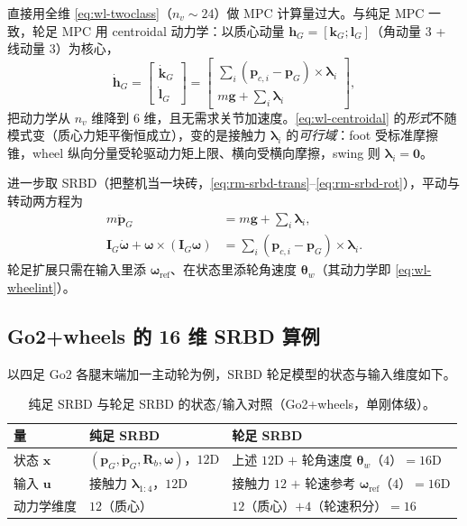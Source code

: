 直接用全维 \cref{eq:wl-twoclass}（$n_v\sim24$）做 MPC 计算量过大。与纯足 MPC 一致，轮足 MPC 用 centroidal 动力学：以质心动量 $\mathbf{h}_G=[\mathbf{k}_G;\mathbf{l}_G]$（角动量 $3$ + 线动量 $3$）为核心，
\begin{equation}
  \dot{\mathbf{h}}_G=\begin{bmatrix}\dot{\mathbf{k}}_G\\ \dot{\mathbf{l}}_G\end{bmatrix}
  =\begin{bmatrix}\sum_i(\mathbf{p}_{c,i}-\mathbf{p}_G)\times\boldsymbol\lambda_i\\[2pt] m\mathbf{g}+\sum_i\boldsymbol\lambda_i\end{bmatrix},
  \label{eq:wl-centroidal}
\end{equation}
把动力学从 $n_v$ 维降到 $6$ 维，且无需求关节加速度。\cref{eq:wl-centroidal} 的\emph{形式}不随模式变（质心力矩平衡恒成立），变的是接触力 $\boldsymbol\lambda_i$ 的\emph{可行域}：foot 受标准摩擦锥，wheel 纵向分量受轮驱动力矩上限、横向受横向摩擦，swing 则 $\boldsymbol\lambda_i=\mathbf{0}$。

进一步取 SRBD（把整机当一块砖，\cref{eq:rm-srbd-trans}--\cref{eq:rm-srbd-rot}），平动与转动两方程为
\begin{align}
  m\ddot{\mathbf{p}}_G&=m\mathbf{g}+\sum_i\boldsymbol\lambda_i,\\
  \mathbf{I}_G\dot{\boldsymbol\omega}+\boldsymbol\omega\times(\mathbf{I}_G\boldsymbol\omega)&=\sum_i(\mathbf{p}_{c,i}-\mathbf{p}_G)\times\boldsymbol\lambda_i.
  \label{eq:wl-srbd}
\end{align}
轮足扩展只需在输入里添 $\boldsymbol\omega_{\mathrm{ref}}$、在状态里添轮角速度 $\boldsymbol\theta_w$（其动力学即 \cref{eq:wl-wheelint}）。

\subsection{Go2+wheels 的 16 维 SRBD 算例}

以四足 Go2 各腿末端加一主动轮为例，SRBD 轮足模型的状态与输入维度如下。

\begin{table}[H]\centering\small
\caption{纯足 SRBD 与轮足 SRBD 的状态/输入对照（Go2+wheels，单刚体级）。}
\label{tab:wl-srbd-dim}
\begin{tabular}{lll}
\toprule
量 & 纯足 SRBD & 轮足 SRBD \\
\midrule
状态 $\mathbf{x}$ & $(\mathbf{p}_G,\dot{\mathbf{p}}_G,\mathbf{R}_b,\boldsymbol\omega)$，$12$D & 上述 $12$D $+$ 轮角速度 $\boldsymbol\theta_w$（$4$）$=16$D \\
输入 $\mathbf{u}$ & 接触力 $\boldsymbol\lambda_{1:4}$，$12$D & 接触力 $12$ $+$ 轮速参考 $\boldsymbol\omega_{\mathrm{ref}}$（$4$）$=16$D \\
动力学维度 & $12$（质心） & $12$（质心）$+4$（轮速积分）$=16$ \\
\bottomrule
\end{tabular}
\end{table}

